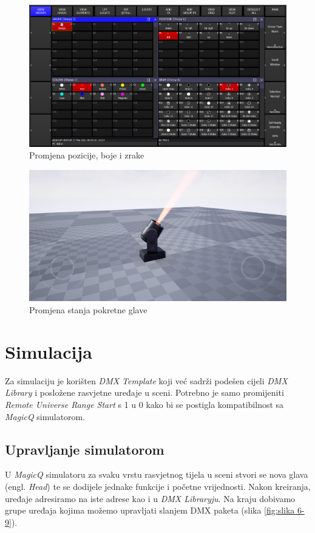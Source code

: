 \documentclass[times, utf8, zavrsni, numeric]{fer}
\begin{document}
\begin{figure}[htp]
	\centering
	\includegraphics[width=\linewidth]{slika 6-7.png}
	\caption{Promjena pozicije, boje i zrake}
	\label{fig:slika 6-7}
\end{figure}

\begin{figure}[htp]
	\centering
	\includegraphics[width=\linewidth]{slika 6-8.png}
	\caption{Promjena stanja pokretne glave}
	\label{fig:slika 6-8}
\end{figure}

\section{Simulacija}
Za simulaciju je korišten \emph{DMX Template} koji već sadrži podešen cijeli \emph{DMX Library} i posložene rasvjetne uređaje u sceni. Potrebno je samo promijeniti \emph{Remote Universe Range Start} s 1 u 0 kako bi se postigla kompatibilnost sa \emph{MagicQ} simulatorom.

\subsection{Upravljanje simulatorom}
U \emph{MagicQ} simulatoru za svaku vrstu rasvjetnog tijela u sceni stvori se nova glava (engl. \emph{Head}) te se dodijele jednake funkcije i početne vrijednosti. Nakon kreiranja, uređaje adresiramo na iste adrese kao i u \emph{DMX Libraryju}. Na kraju dobivamo grupe uređaja kojima možemo upravljati slanjem DMX paketa (slika \ref{fig:slika 6-9}).
\end{document}
